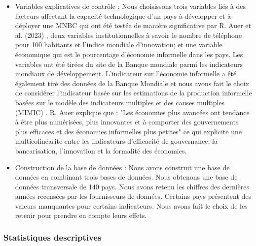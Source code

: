 \documentclass[12pt]{article}
\begin{document}
\begin{itemize}
    \item Variables explicatives de contrôle : Nous choisissons trois variables  liés à des facteurs affectant la capacité technologique d'un pays à développer et à déployer une MNBC  qui ont été testée de manière significative par R. Auer et al. (2023) \cite{RePEc:bis:biswps:880}, deux variables institutionnelles à savoir le nombre de téléphone pour 100 habitants et l'indice mondiale d'innovation; et une variable économique qui est le pourcentage d'économie informelle dans les pays. Les variables ont été tirées du site de la Banque mondiale parmi les indicateurs mondiaux de développement. L'indicateur sur l'économie informelle a été également tiré des données de la Banque Mondiale et nous avons fait le choix de considérer l'indicateur basée sur les estimations de la production informelle basées sur le modèle des indicateurs multiples et des causes multiples (MIMIC) \cite{RePEc:cpr:ceprdp:16497}\cite{medina_shedding_2019}. R. Auer explique que : "Les économies plus avancées ont tendance à être plus numérisées, plus innovantes et à comporter des gouvernements plus efficaces et des économies informelles plus petites" ce qui explicite une multicolinéarité entre les indicateurs d'efficacité de gouvernance, la bancarisation, l'innovation et la formalité des économies.
    \item  Construction de la base de données : Nous avons construit une base de données en combinant trois bases de données. Nous obtenons une base de données transversale de 140 pays. Nous avons retenu les chiffres des dernières années recensées par les fournisseurs de données. Certains pays présentent des valeurs manquantes pour certains indicateurs. Nous avons fait le choix de les retenir pour prendre en compte leurs effets.

\end{itemize}
\clearpage


\subsubsection{Statistiques descriptives}
\end{document}
